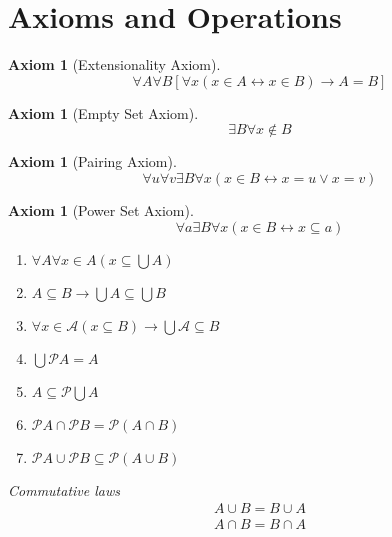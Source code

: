 \documentclass[letterpaper, 10pt]{article}
\numberwithin{thm}{section}
\newtheorem{axiom}[thm]{Axiom}
\theoremstyle{definition}
\begin{document}
\section{Axioms and Operations}

\begin{axiom}[Extensionality Axiom]
	\begin{equation*}
		\forall A\forall B[\forall x(x \in A \leftrightarrow x \in B)
		\rightarrow A = B]
	\end{equation*}
\end{axiom}

\begin{axiom}[Empty Set Axiom]
	\begin{equation*}
		\exists B \forall x \notin B
	\end{equation*}
\end{axiom}


\begin{axiom}[Pairing Axiom]
	\begin{equation*}
		\forall u \forall v \exists B \forall x(x \in B \leftrightarrow 
		x = u \lor x = v)
	\end{equation*}
\end{axiom}

\begin{axiom}[Power Set Axiom]
	\begin{equation*}
		\forall a \exists B \forall x (x \in B \leftrightarrow x \subseteq a)
	\end{equation*}
\end{axiom}

\begin{enumerate}[label=\arabic*.]
	\item $\forall A \forall x \in A (x \subseteq \bigcup A)$
	\item $A \subseteq B \rightarrow \bigcup A \subseteq \bigcup B$
	\item $\forall x \in \mathcal{A} (x \subseteq B) \rightarrow \bigcup \mathcal{A}
		\subseteq B$
	\item $\bigcup\mathcal{P}A = A$
	\item $A \subseteq \mathcal{P}\bigcup A$
	\item $\mathcal{P}A \cap \mathcal{P}B = \mathcal{P}(A \cap B)$
	\item $\mathcal{P}A \cup \mathcal{P}B \subseteq \mathcal{P}(A \cup B)$
\end{enumerate}

\emph{Commutative laws}
\begin{gather*}
	A \cup B = B \cup A \\
	A \cap B = B \cap A
\end{gather*}
\end{document}
